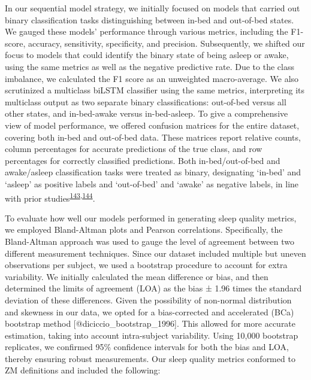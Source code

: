 \documentclass[
  9pt,
]{scrbook}
\begin{document}
In our sequential model strategy, we initially focused on models that
carried out binary classification tasks distinguishing between in-bed
and out-of-bed states. We gauged these models' performance through
various metrics, including the F1-score, accuracy, sensitivity,
specificity, and precision. Subsequently, we shifted our focus to models
that could identify the binary state of being asleep or awake, using the
same metrics as well as the negative predictive rate. Due to the class
imbalance, we calculated the F1 score as an unweighted macro-average. We
also scrutinized a multiclass biLSTM classifier using the same metrics,
interpreting its multiclass output as two separate binary
classifications: out-of-bed versus all other states, and in-bed-awake
versus in-bed-asleep. To give a comprehensive view of model performance,
we offered confusion matrices for the entire dataset, covering both
in-bed and out-of-bed data. These matrices report relative counts,
column percentages for accurate predictions of the true class, and row
percentages for correctly classified predictions. Both in-bed/out-of-bed
and awake/asleep classification tasks were treated as binary,
designating `in-bed' and `asleep' as positive labels and `out-of-bed'
and `awake' as negative labels, in line with prior
studies\textsuperscript{\protect\hyperlink{ref-hjorth_measure_2012}{143},\protect\hyperlink{ref-kushida_comparison_2001}{144}}.

To evaluate how well our models performed in generating sleep quality
metrics, we employed Bland-Altman plots and Pearson correlations.
Specifically, the Bland-Altman approach was used to gauge the level of
agreement between two different measurement techniques. Since our
dataset included multiple but uneven observations per subject, we used a
bootstrap procedure to account for extra variability. We initially
calculated the mean difference or bias, and then determined the limits
of agreement (LOA) as the bias ± 1.96 times the standard deviation of
these differences. Given the possibility of non-normal distribution and
skewness in our data, we opted for a bias-corrected and accelerated
(BCa) bootstrap method {[}@diciccio\_bootstrap\_1996{]}. This allowed
for more accurate estimation, taking into account intra-subject
variability. Using 10,000 bootstrap replicates, we confirmed 95\%
confidence intervals for both the bias and LOA, thereby ensuring robust
measurements. Our sleep quality metrics conformed to ZM definitions and
included the following:
\end{document}
